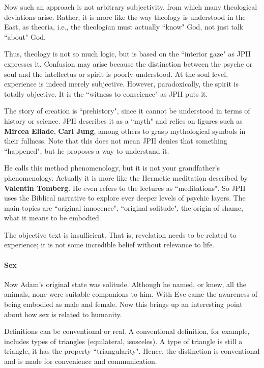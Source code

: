 Now such an approach is not arbitrary subjectivity, from which many theological deviations arise. Rather, it is more like the way theology is understood in the East, as theoria, i.e., the theologian must actually ``know" God, not just talk ``about" God.

Thus, theology is not so much logic, but is based on the ``interior gaze" as JPII expresses it. Confusion may arise because the distinction between the psyche or soul and the intellectus or spirit is poorly understood. At the soul level, experience is indeed merely subjective. However, paradoxically, the spirit is totally objective. It is the ``witness to conscience" as JPII puts it.

The story of creation is ``prehistory", since it cannot be understood in terms of history or science. JPII describes it as a ``myth" and relies on figures such as \textbf{Mircea Eliade}, \textbf{Carl Jung}, among others to grasp mythological symbols in their fullness. Note that this does not mean JPII denies that something ``happened", but he proposes a way to understand it.

He calls this method phenomenology, but it is not your grandfather's phenomenology. Actually it is more like the Hermetic meditation described by \textbf{Valentin Tomberg}. He even refers to the lectures as ``meditations". So JPII uses the Biblical narrative to explore ever deeper levels of psychic layers. The main topics are ``original innocence", ``original solitude", the origin of shame, what it means to be embodied.

The objective text is insufficient. That is, revelation needs to be related to experience; it is not some incredible belief without relevance to life.

\paragraph{Sex}
Now Adam's original state was solitude. Although he named, or knew, all the animals, none were suitable companions to him. With Eve came the awareness of being embodied as male and female. Now this brings up an interesting point about how sex is related to humanity.

Definitions can be conventional or real. A conventional definition, for example, includes types of triangles (equilateral, isosceles). A type of triangle is still a triangle, it has the property ``triangularity". Hence, the distinction is conventional and is made for convenience and communication.

